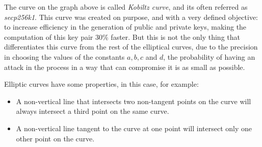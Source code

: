 \documentclass{article}
\begin{document}

The curve on the graph above is called \textit{Kobiltz curve}, and its often referred as \textit{secp256k1}. This curve was created on purpose, and with a very defined objective: to increase efficiency in the generation of public and private keys, making the computation of this key pair 30\% faster. But this is not the only thing that differentiates this curve from the rest of the elliptical curves, due to the precision in choosing the values of the constants \(a, b, c\) and \(d\), the probability of having an attack in the process in a way that can compromise it is as small as possible.

Elliptic curves have some properties, in  this case, for example:

\begin{itemize}
    \item A non-vertical line that intersects two non-tangent points on the curve will always intersect a third point on the same curve.
    \item A non-vertical line tangent to the curve at one point will intersect only one other point on the curve.
\end{itemize}
\end{document}
